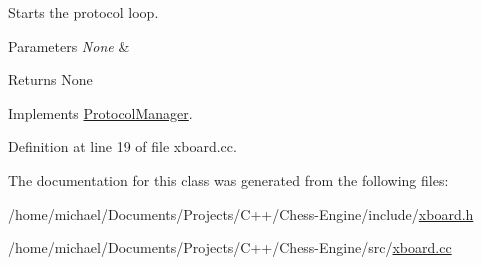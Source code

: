 Starts the protocol loop. 


\begin{DoxyParams}{Parameters}
{\em None} & \\
\hline
\end{DoxyParams}
\begin{DoxyReturn}{Returns}
None 
\end{DoxyReturn}


Implements \mbox{\hyperlink{classProtocolManager_aa3ae25a03e2f070ea486fd9319715a6a}{Protocol\+Manager}}.



Definition at line 19 of file xboard.\+cc.



The documentation for this class was generated from the following files\+:\begin{DoxyCompactItemize}
\item 
/home/michael/\+Documents/\+Projects/\+C++/\+Chess-\/\+Engine/include/\mbox{\hyperlink{xboard_8h}{xboard.\+h}}\item 
/home/michael/\+Documents/\+Projects/\+C++/\+Chess-\/\+Engine/src/\mbox{\hyperlink{xboard_8cc}{xboard.\+cc}}\end{DoxyCompactItemize}
